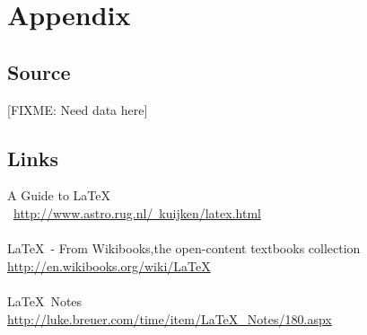 \documentclass[12pt,letterpaper,dvips]{article}
\newcommand{\FIXME}[1]{\textsf{[FIXME: #1]}}
\begin{document}
\setcounter{secnumdepth}{0}
\section{Appendix}

\subsection{Source}
\FIXME{Need data here}


\subsection{Links}
A Guide to \LaTeX\\\
\href{http://www.astro.rug.nl/~kuijken/latex.html}
{http://www.astro.rug.nl/~kuijken/latex.html}
\\
\\
\LaTeX\ - From Wikibooks,the open-content textbooks collection\\
\href{http://en.wikibooks.org/wiki/LaTeX}{http://en.wikibooks.org/wiki/LaTeX}
\\
\\
\LaTeX\ Notes\\
\href{http://luke.breuer.com/time/item/LaTeX\_Notes/180.aspx}{http://luke.breuer.com/time/item/LaTeX\_Notes/180.aspx}
\end{document}
